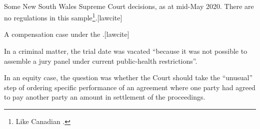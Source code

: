 \newcommand\yb[1]{\colorbox{blue!12}{#1}}




\newcommand\cmd[1]{\texttt{\textbackslash#1}}
\newcommand\marg[1]{\texttt{\{#1\}}}
\newcommand\oarg[1]{\texttt{[#1]}}


\setnumparshiftleft{\hspace{-2.5em}}
\setnumparfillright{\hspace{3.5em}}
\setnumparformat{\color{blue}\bfseries}
\setnumpardelimleft{}






\maketitle
\extendtheindex{}{\useindexpreamble}{}{}
\printlawciteindexes
\bigskip
\hfill{}\hfill\ %
\bigskip





\p\noindent Some New South Wales  Supreme Court decisions, as at mid-May 2020. There are no regulations in this sample\footnote{Like Canadian .}.[lawcite]
\bigskip




\p A compensation case under the .[lawcite]

\p In a criminal matter, the trial date was vacated ``because it was not possible to assemble a jury panel under current public-health restrictions''.

\p In an equity case, the question was whether the Court should take the ``unusual'' step of ordering specific performance of an agreement where one party had agreed to pay another party an amount in settlement of the proceedings.


